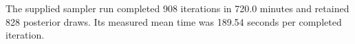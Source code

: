 The supplied sampler run completed 908 iterations in 720.0 minutes and retained 828 posterior draws. Its measured mean time was 189.54 seconds per completed iteration.
